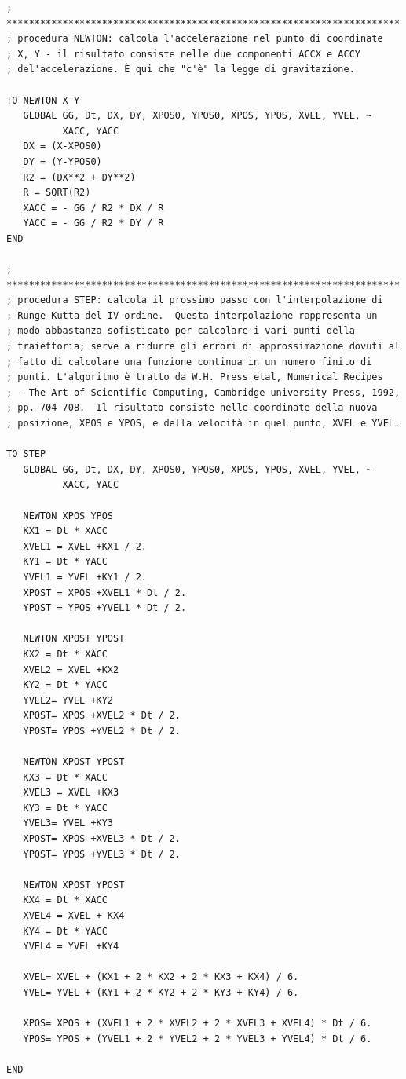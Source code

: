 \begin{lstlisting}[frame=single]
; **********************************************************************
; procedura NEWTON: calcola l'accelerazione nel punto di coordinate 
; X, Y - il risultato consiste nelle due componenti ACCX e ACCY 
; del'accelerazione. È qui che "c'è" la legge di gravitazione.

TO NEWTON X Y 
   GLOBAL GG, Dt, DX, DY, XPOS0, YPOS0, XPOS, YPOS, XVEL, YVEL, ~ 
          XACC, YACC 
   DX = (X-XPOS0)
   DY = (Y-YPOS0)
   R2 = (DX**2 + DY**2)
   R = SQRT(R2)
   XACC = - GG / R2 * DX / R
   YACC = - GG / R2 * DY / R
END

; **********************************************************************
; procedura STEP: calcola il prossimo passo con l'interpolazione di 
; Runge-Kutta del IV ordine.  Questa interpolazione rappresenta un 
; modo abbastanza sofisticato per calcolare i vari punti della 
; traiettoria; serve a ridurre gli errori di approssimazione dovuti al 
; fatto di calcolare una funzione continua in un numero finito di 
; punti. L'algoritmo è tratto da W.H. Press etal, Numerical Recipes 
; - The Art of Scientific Computing, Cambridge university Press, 1992, 
; pp. 704-708.  Il risultato consiste nelle coordinate della nuova 
; posizione, XPOS e YPOS, e della velocità in quel punto, XVEL e YVEL.

TO STEP
   GLOBAL GG, Dt, DX, DY, XPOS0, YPOS0, XPOS, YPOS, XVEL, YVEL, ~
          XACC, YACC 

   NEWTON XPOS YPOS
   KX1 = Dt * XACC
   XVEL1 = XVEL +KX1 / 2.
   KY1 = Dt * YACC
   YVEL1 = YVEL +KY1 / 2.
   XPOST = XPOS +XVEL1 * Dt / 2.
   YPOST = YPOS +YVEL1 * Dt / 2.

   NEWTON XPOST YPOST
   KX2 = Dt * XACC 
   XVEL2 = XVEL +KX2 
   KY2 = Dt * YACC 
   YVEL2= YVEL +KY2
   XPOST= XPOS +XVEL2 * Dt / 2.
   YPOST= YPOS +YVEL2 * Dt / 2.

   NEWTON XPOST YPOST
   KX3 = Dt * XACC 
   XVEL3 = XVEL +KX3 
   KY3 = Dt * YACC 
   YVEL3= YVEL +KY3
   XPOST= XPOS +XVEL3 * Dt / 2.
   YPOST= YPOS +YVEL3 * Dt / 2.
 
   NEWTON XPOST YPOST
   KX4 = Dt * XACC 
   XVEL4 = XVEL + KX4 
   KY4 = Dt * YACC 
   YVEL4 = YVEL +KY4

   XVEL= XVEL + (KX1 + 2 * KX2 + 2 * KX3 + KX4) / 6. 
   YVEL= YVEL + (KY1 + 2 * KY2 + 2 * KY3 + KY4) / 6. 

   XPOS= XPOS + (XVEL1 + 2 * XVEL2 + 2 * XVEL3 + XVEL4) * Dt / 6.
   YPOS= YPOS + (YVEL1 + 2 * YVEL2 + 2 * YVEL3 + YVEL4) * Dt / 6.
 
END


\end{lstlisting}
